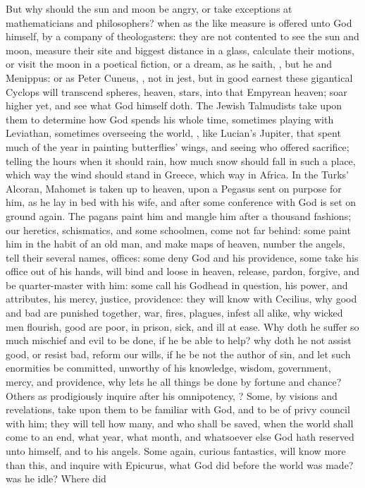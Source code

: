 {But why should the sun and moon be angry, or take exceptions at mathematicians and philosophers? when as the like measure is offered unto God himself, by a company of theologasters: they are not contented to see the sun and moon, measure their site and biggest distance in a glass, calculate their motions, or visit the moon in a poetical fiction, or a dream, as he saith, , but he and Menippus: or as Peter Cuneus, , not in jest, but in good earnest these gigantical Cyclops will transcend spheres, heaven, stars, into that Empyrean heaven; soar higher yet, and see what God himself doth. The Jewish Talmudists take upon them to determine how God spends his whole time, sometimes playing with Leviathan, sometimes overseeing the world, \etc{}, like Lucian's Jupiter, that spent much of the year in painting butterflies' wings, and seeing who offered sacrifice; telling the hours when it should rain, how much snow should fall in such a place, which way the wind should stand in Greece, which way in Africa. In the Turks' Alcoran, Mahomet is taken up to heaven, upon a Pegasus sent on purpose for him, as he lay in bed with his wife, and after some conference with God is set on ground again. The pagans paint him and mangle him after a thousand fashions; our heretics, schismatics, and some schoolmen, come not far behind: some paint him in the habit of an old man, and make maps of heaven, number the angels, tell their several names, offices: some deny God and his providence, some take his office out of his hands, will bind and loose in heaven, release, pardon, forgive, and be quarter-master with him: some call his Godhead in question, his power, and attributes, his mercy, justice, providence: they will know with Cecilius, why good and bad are punished together, war, fires, plagues, infest all alike, why wicked men flourish, good are poor, in prison, sick, and ill at ease. Why doth he suffer so much mischief and evil to be done, if he be able to help? why doth he not assist good, or resist bad, reform our wills, if he be not the author of sin, and let such enormities be committed, unworthy of his knowledge, wisdom, government, mercy, and providence, why lets he all things be done by fortune and chance? Others as prodigiously inquire after his omnipotency, ? Some, by visions and revelations, take upon them to be familiar with God, and to be of privy council with him; they will tell how many, and who shall be saved, when the world shall come to an end, what year, what month, and whatsoever else God hath reserved unto himself, and to his angels. Some again, curious fantastics, will know more than this, and inquire with Epicurus, what God did before the world was made? was he idle? Where did }
